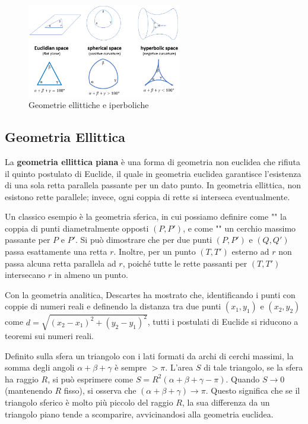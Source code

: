 \begin{figure}[H]
    \centering
    \includegraphics[width=0.6\textwidth]{assets/geometries.png}
    \caption{Geometrie ellittiche e iperboliche}
\end{figure}

\subsection{Geometria Ellittica}

La \textbf{geometria ellittica piana} è una forma di geometria non euclidea che rifiuta il quinto postulato di Euclide, il quale in geometria euclidea garantisce l'esistenza di una sola retta parallela passante per un dato punto. In geometria ellittica, non esistono rette parallele; invece, ogni coppia di rette si interseca eventualmente.

Un classico esempio è la geometria sferica, in cui possiamo definire come "" la coppia di punti diametralmente opposti $(P, P')$, e come "" un cerchio massimo passante per $P$ e $P'$. Si può dimostrare che per due punti $(P, P')$ e $(Q, Q')$ passa esattamente una retta $r$. Inoltre, per un punto $(T, T')$ esterno ad $r$ non passa alcuna retta parallela ad $r$, poiché tutte le rette passanti per $(T, T')$ intersecano $r$ in almeno un punto.

Con la geometria analitica, Descartes ha mostrato che, identificando i punti con coppie di numeri reali e definendo la distanza tra due punti $(x_1, y_1)$ e $(x_2, y_2)$ come $d = \sqrt{(x_2 - x_1)^2 + (y_2 - y_1)^2}$, tutti i postulati di Euclide si riducono a teoremi sui numeri reali.

Definito sulla sfera un triangolo con i lati formati da archi di cerchi massimi, la somma degli angoli $\alpha + \beta + \gamma$ è sempre $> \pi$. L'area $S$ di tale triangolo, se la sfera ha raggio $R$, si può esprimere come $S = R^2(\alpha + \beta + \gamma - \pi)$. Quando $S \to 0$ (mantenendo $R$ fisso), si osserva che $(\alpha + \beta + \gamma) \to \pi$. Questo significa che se il triangolo sferico è molto più piccolo del raggio $R$, la sua differenza da un triangolo piano tende a scomparire, avvicinandosi alla geometria euclidea.

